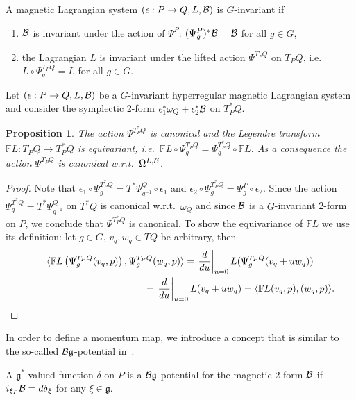 \documentclass[11pt]{article}
\newtheorem{proposition}{Proposition}
\newcommand{\B}{{\cal B}}
\newcommand{\e}{\epsilon}
\newcommand{\lag}{\mathfrak{g}}
\newcommand{\F}{\mathbb{F}}
\begin{document}
\begin{definition}  A magnetic Lagrangian system $(\e:P\to Q,L,\B)$ is $G$-invariant if
\begin{enumerate}\itemsep=0pt
\item[1)] $\B$ is invariant under the action of $\Psi^P$: $(\Psi^P_g)^*\B = \B$ for all $g\in G$,
\item[2)] the Lagrangian $L$ is invariant under the lifted action $\Psi^{T_PQ}$ on $T_PQ$, i.e.\ $L\circ \Psi^{T_PQ}_g = L$ for all $g\in G$.
    \end{enumerate}
\end{definition}



Let  $(\e:P\to Q, L,\B)$ be a $G$-invariant hyperregular magnetic Lagrangian system and consider the symplectic 2-form $\e^*_1\omega_Q +\e^*_2 \B$ on $T^*_PQ$.
\begin{proposition}\label{prop:equivleg} The action $\Psi^{T^*_PQ}$ is canonical and the Legendre transform $\F L: T_PQ\to T_P^*Q$ is equivariant, i.e.\  $\F L \circ \Psi^{T_PQ}_g=\Psi_g^{T^*_PQ}\circ \F L$. As a consequence the action $\Psi^{T_PQ}$ is canonical w.r.t.~$\Omega^{L,\B}$.
\end{proposition}
\begin{proof}
Note that $\e_1 \circ \Psi^{T^*_PQ}_g = T^*\Psi^Q_{g^{-1}}\circ \e_1$ and $\e_2 \circ \Psi^{T^*_PQ}_g = \Psi^P_g\circ \e_2$. Since the action $\Psi^{T^*Q}_g=T^*\Psi^Q_{g^{-1}}$ on $T^*Q$ is canonical w.r.t.\ $\omega_Q$ and since $\B$ is a $G$-invariant 2-form on $P$, we conclude that $\Psi^{T^*_PQ}$ is canonical. To show the equivariance of $\F L$ we use its def\/inition: let $g\in G$, $v_q,w_q\in TQ$ be arbitrary, then
\begin{gather*}
\langle \F L\left(\Psi_g^{T_PQ}(v_q,p)\right) , \Psi_g^{T_PQ} (w_q,p) \rangle  = \left.\frac{d}{du}\right|_{u=0} L( \Psi_g^{T_PQ}(v_q+uw_q))\\
\hphantom{\langle \F L\left(\Psi_g^{T_PQ}(v_q,p)\right) , \Psi_g^{T_PQ} (w_q,p) \rangle}{}
=\left.\frac{d}{du}\right|_{u=0} L(v_q+uw_q) = \langle \F L(v_q,p), (w_q,p)\rangle. \tag*{\qed}
\end{gather*}\renewcommand{\qed}{}
\end{proof}

In order to def\/ine a momentum map, we introduce a concept that is similar to the so-called  $\B\lag$-potential in~\cite{MarsdenHamRed}.

\begin{definition} \label{def:bgpotential}
A $\lag^*$-valued function $\delta$ on $P$ is a $\B\lag$-potential for the magnetic 2-form $\B$ if $i_{\xi_{P}}\B = d\delta_{\xi}$  for any $\xi \in \lag$.
\end{definition}
\end{document}

